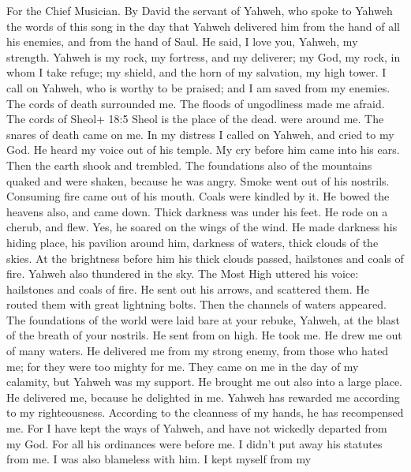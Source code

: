 For the Chief Musician. By David the servant of Yahweh, who spoke to
Yahweh the words of this song in the day that Yahweh delivered him from
the hand of all his enemies, and from the hand of Saul. He said,
 I love you, Yahweh, my strength.  Yahweh is my
rock, my fortress, and my deliverer; my God, my rock, in whom I take
refuge; my shield, and the horn of my salvation, my high tower.
 I call on Yahweh, who is worthy to be praised; and I am
saved from my enemies.  The cords of death surrounded me.
The floods of ungodliness made me afraid.  The cords of
Sheol+ 18:5 Sheol is the place of the dead. were around me. The snares
of death came on me.  In my distress I called on Yahweh, and
cried to my God. He heard my voice out of his temple. My cry before him
came into his ears.  Then the earth shook and trembled. The
foundations also of the mountains quaked and were shaken, because he was
angry.  Smoke went out of his nostrils. Consuming fire came
out of his mouth. Coals were kindled by it.  He bowed the
heavens also, and came down. Thick darkness was under his feet.
 He rode on a cherub, and flew. Yes, he soared on the wings
of the wind.  He made darkness his hiding place, his
pavilion around him, darkness of waters, thick clouds of the skies.
 At the brightness before him his thick clouds passed,
hailstones and coals of fire.  Yahweh also thundered in the
sky. The Most High uttered his voice: hailstones and coals of fire.
 He sent out his arrows, and scattered them. He routed them
with great lightning bolts.  Then the channels of waters
appeared. The foundations of the world were laid bare at your rebuke,
Yahweh, at the blast of the breath of your nostrils.  He
sent from on high. He took me. He drew me out of many waters.
 He delivered me from my strong enemy, from those who hated
me; for they were too mighty for me.  They came on me in
the day of my calamity, but Yahweh was my support.  He
brought me out also into a large place. He delivered me, because he
delighted in me.  Yahweh has rewarded me according to my
righteousness. According to the cleanness of my hands, he has
recompensed me.  For I have kept the ways of Yahweh, and
have not wickedly departed from my God.  For all his
ordinances were before me. I didn't put away his statutes from me.
 I was also blameless with him. I kept myself from my
